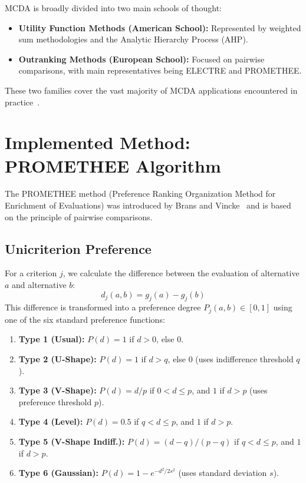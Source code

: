 \documentclass[12pt,a4paper,oneside]{report}
\begin{document}
MCDA is broadly divided into two main schools of thought:
\begin{itemize}
    \item \textbf{Utility Function Methods (American School):} Represented by weighted sum methodologies and the Analytic Hierarchy Process (AHP).
    \item \textbf{Outranking Methods (European School):} Focused on pairwise comparisons, with main representatives being ELECTRE and PROMETHEE.
\end{itemize}
These two families cover the vast majority of MCDA applications encountered in practice~\cite{belton2002}.

\section{Implemented Method: PROMETHEE Algorithm}
The PROMETHEE method (Preference Ranking Organization Method for Enrichment of Evaluations) was introduced by Brans and Vincke~\cite{brans1985} and is based on the principle of pairwise comparisons.

\subsection{Unicriterion Preference}
For a criterion $j$, we calculate the difference between the evaluation of alternative $a$ and alternative $b$:
\begin{equation}
    d_j(a, b) = g_j(a) - g_j(b)
\end{equation}
This difference is transformed into a preference degree $P_j(a,b) \in [0, 1]$ using one of the six standard preference functions:
\begin{enumerate}
    \item \textbf{Type 1 (Usual):} $P(d) = 1$ if $d > 0$, else $0$.
    \item \textbf{Type 2 (U-Shape):} $P(d) = 1$ if $d > q$, else $0$ (uses indifference threshold $q$).
    \item \textbf{Type 3 (V-Shape):} $P(d) = d/p$ if $0 < d \le p$, and $1$ if $d > p$ (uses preference threshold $p$).
    \item \textbf{Type 4 (Level):} $P(d) = 0.5$ if $q < d \le p$, and $1$ if $d > p$.
    \item \textbf{Type 5 (V-Shape Indiff.):} $P(d) = (d-q)/(p-q)$ if $q < d \le p$, and $1$ if $d > p$.
    \item \textbf{Type 6 (Gaussian):} $P(d) = 1 - e^{-d^2/2s^2}$ (uses standard deviation $s$).
\end{enumerate}
\end{document}
